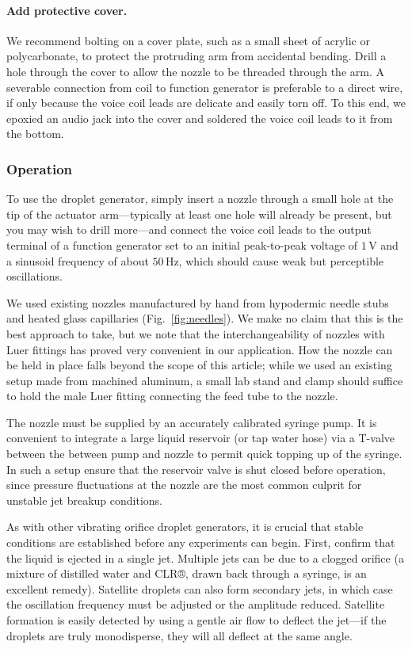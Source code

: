 \documentclass[11.5pt]{book}
\newcommand*{\figref}[1]{Fig.~\ref{#1}}
\begin{document}
\paragraph{Add protective cover.} We recommend bolting on a cover plate, such
as a small sheet of acrylic or polycarbonate, to protect the protruding arm from
accidental bending. Drill a hole through the cover to allow the nozzle to be
threaded through the arm. A severable
connection from coil to function generator is preferable to a direct wire, if
only because the voice coil leads are delicate and easily torn off. To this end, we epoxied
an audio jack into the cover and soldered the voice coil leads to it from the
bottom. 

\subsubsection{Operation}
To use the droplet generator, simply insert a nozzle through a small hole at the
tip of the actuator arm---typically at least one hole will already be present, but you may wish to drill
more---and connect the voice coil leads to the output terminal of a function
generator set to an initial peak-to-peak voltage of $1\,$V and a sinusoid frequency of
about $50\,$Hz, which should cause weak but perceptible oscillations.


We used existing nozzles manufactured by hand from hypodermic needle stubs and
heated glass capillaries (\figref{fig:needles}). We make no claim that this is
the best approach to take, but we note that the interchangeability of nozzles
with Luer fittings has proved very convenient in our application. How the nozzle
can be held in place falls beyond the scope of this article; while we used an
existing setup made from machined aluminum, a small lab stand and clamp should
suffice to hold the male Luer fitting connecting the feed tube to the nozzle.

The nozzle must be supplied by an accurately calibrated syringe pump. It is
convenient to integrate a large liquid reservoir (or tap water hose) via a
T-valve between the between pump and nozzle to permit quick topping up of the
syringe. In such a setup ensure that the reservoir valve is shut closed before operation,
since pressure fluctuations at the nozzle are the most common culprit for
unstable jet breakup conditions.

As with other vibrating orifice droplet generators, it is crucial that stable
conditions are established before any experiments can begin. First, confirm that
the liquid is ejected in a single jet. Multiple jets can be due to a clogged
orifice (a mixture of distilled water and CLR®, drawn back through a
syringe, is an excellent remedy). Satellite droplets can also form secondary
jets, in which case the oscillation frequency must be adjusted or the amplitude
reduced. Satellite formation is easily detected by using a gentle air flow to
deflect the jet---if the droplets are truly monodisperse, they will all deflect
at the same angle.\cite{Strom69}
\end{document}
